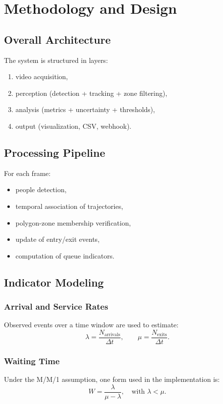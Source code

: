 \chapter{Methodology and Design}
\chaptertoc

\section{Overall Architecture}
The system is structured in layers:
\begin{enumerate}
    \item video acquisition,
    \item perception (detection + tracking + zone filtering),
    \item analysis (metrics + uncertainty + thresholds),
    \item output (visualization, CSV, webhook).
\end{enumerate}

\section{Processing Pipeline}
For each frame:
\begin{itemize}
    \item people detection,
    \item temporal association of trajectories,
    \item polygon-zone membership verification,
    \item update of entry/exit events,
    \item computation of queue indicators.
\end{itemize}

\section{Indicator Modeling}
\subsection{Arrival and Service Rates}
Observed events over a time window are used to estimate:
\begin{equation}
\lambda = \frac{N_{\text{arrivals}}}{\Delta t},
\qquad
\mu = \frac{N_{\text{exits}}}{\Delta t}.
\end{equation}

\subsection{Waiting Time}
Under the M/M/1 assumption, one form used in the implementation is:
\begin{equation}
W = \frac{\lambda}{\mu - \lambda}, \quad \text{with } \lambda < \mu.
\end{equation}

